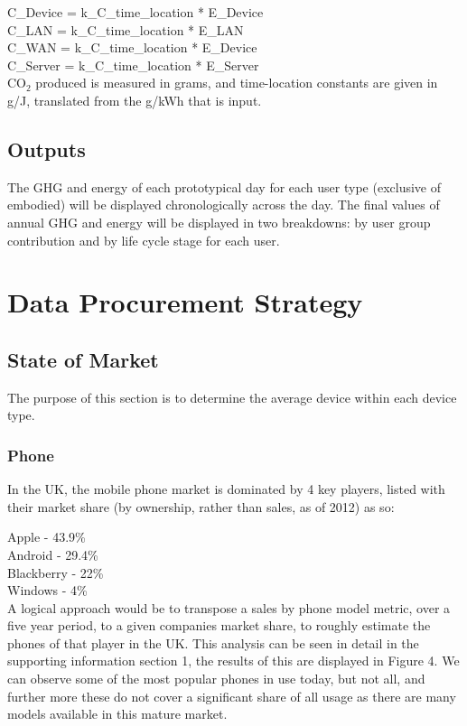 \documentclass[conference]{IEEEtran}
\begin{document}
C\_Device = k\_C\_time\_location * E\_Device\\
C\_LAN = k\_C\_time\_location * E\_LAN\\
C\_WAN = k\_C\_time\_location * E\_Device\\
C\_Server = k\_C\_time\_location * E\_Server\\

CO$_2$ produced is measured in grams, and time-location constants are
given in g/J, translated from the g/kWh that is input.

\subsection{Outputs}

The GHG and energy of each prototypical day for each user type
(exclusive of embodied) will be displayed chronologically across the
day. The final values of annual GHG and energy will be displayed in two
breakdowns: by user group contribution and by life cycle stage for
each user.


\section{Data Procurement Strategy}

\subsection{State of Market}

The purpose of this section is to determine the average device within
each device type.

\subsubsection{Phone}

In the UK, the mobile phone market is dominated by 4 key players,
listed with their market share (by ownership, rather than sales, as of
2012) as so:

Apple - 43.9\%\\
Android - 29.4\%\\
Blackberry - 22\%\\
Windows - 4\%\\

A logical approach would be to transpose a sales by phone model
metric, over a five year period, to a given companies market share, to
roughly estimate the phones of that player in the UK. This analysis
can be seen in detail in the supporting information section 1, the
results of this are displayed in Figure 4. We can observe some of the
most popular phones in use today, but not all, and further more these
do not cover a significant share of all usage as there are many models
available in this mature market.
\end{document}
